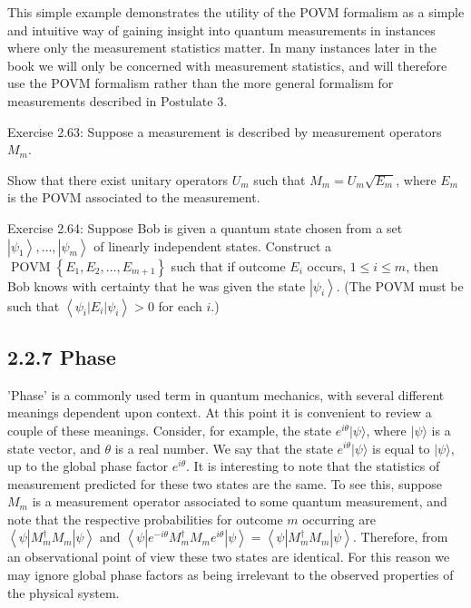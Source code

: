 \documentclass[10pt]{article}
\begin{document}
This simple example demonstrates the utility of the POVM formalism as a simple and intuitive way of gaining insight into quantum measurements in instances where only the measurement statistics matter. In many instances later in the book we will only be concerned with measurement statistics, and will therefore use the POVM formalism rather than the more general formalism for measurements described in Postulate 3.

Exercise 2.63: Suppose a measurement is described by measurement operators $M_{m}$.

Show that there exist unitary operators $U_{m}$ such that $M_{m}=U_{m} \sqrt{E_{m}}$, where $E_{m}$ is the POVM associated to the measurement.

Exercise 2.64: Suppose Bob is given a quantum state chosen from a set $\left|\psi_{1}\right\rangle, \ldots,\left|\psi_{m}\right\rangle$ of linearly independent states. Construct a $\operatorname{POVM}\left\{E_{1}, E_{2}, \ldots, E_{m+1}\right\}$ such that if outcome $E_{i}$ occurs, $1 \leq i \leq m$, then Bob knows with certainty that he was given the state $\left|\psi_{i}\right\rangle$. (The POVM must be such that $\left\langle\psi_{i}\left|E_{i}\right| \psi_{i}\right\rangle>0$ for each $i$.)

\subsection*{2.2.7 Phase}
'Phase' is a commonly used term in quantum mechanics, with several different meanings dependent upon context. At this point it is convenient to review a couple of these meanings. Consider, for example, the state $e^{i \theta}|\psi\rangle$, where $|\psi\rangle$ is a state vector, and $\theta$ is a real number. We say that the state $e^{i \theta}|\psi\rangle$ is equal to $|\psi\rangle$, up to the global phase factor $e^{i \theta}$. It is interesting to note that the statistics of measurement predicted for these two states are the same. To see this, suppose $M_{m}$ is a measurement operator associated to some quantum measurement, and note that the respective probabilities for outcome $m$ occurring are $\left\langle\psi\left|M_{m}^{\dagger} M_{m}\right| \psi\right\rangle$ and $\left\langle\psi\left|e^{-i \theta} M_{m}^{\dagger} M_{m} e^{i \theta}\right| \psi\right\rangle=\left\langle\psi\left|M_{m}^{\dagger} M_{m}\right| \psi\right\rangle$. Therefore, from an observational point of view these two states are identical. For this reason we may ignore global phase factors as being irrelevant to the observed properties of the physical system.
\end{document}
